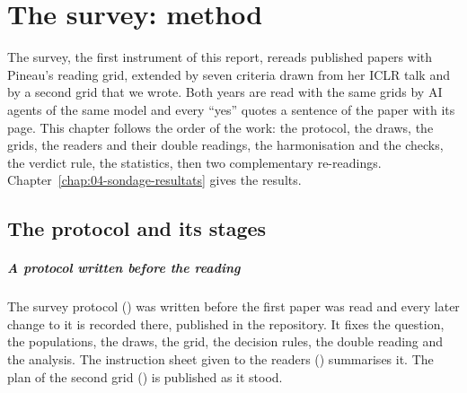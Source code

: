 \chapter{The survey: method}\label{chap:03-sondage-methode}

The survey, the first instrument of this report, rereads published papers with Pineau's reading grid,
extended by seven criteria drawn from her ICLR talk and by a second grid that we wrote. Both years
are read with the same grids by AI agents of the same model and every \enquote{yes} quotes a sentence
of the paper with its page. This chapter follows the order of the work: the protocol, the draws, the
grids, the readers and their double readings, the harmonisation and the checks, the verdict rule, the
statistics, then two complementary re-readings.
Chapter~\ref{chap:04-sondage-resultats} gives the results.

\section{The protocol and its stages}\label{sec:sm-protocole}

\paragraph{A protocol written before the reading}
The survey protocol () was written before the first paper was read and
every later change to it is recorded there, published in the repository. It fixes the question, the
populations, the draws, the grid, the decision rules, the double reading and the analysis. The
instruction sheet given to the readers () summarises it. The plan of the second
grid () is published as it stood.

